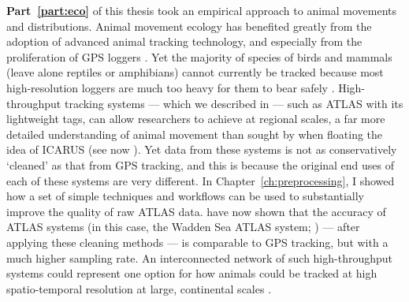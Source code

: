 \textbf{Part~\ref{part:eco}} of this thesis took an empirical approach to animal movements and distributions.
Animal movement ecology has benefited greatly from the adoption of advanced animal tracking technology, and especially from the proliferation of GPS loggers \citep{cagnacci2010}.
Yet the majority of species of birds and mammals (leave alone reptiles or amphibians) cannot currently be tracked because most high-resolution loggers are much too heavy for them to bear safely \parencite{kays2015}.
High-throughput tracking systems --- which we described in \textcite{nathan2022} --- such as ATLAS with its lightweight tags, can allow researchers to achieve at regional scales, a far more detailed understanding of animal movement than sought by \textcite{wikelski2007} when floating the idea of ICARUS (see now \cite{jetz2022}).
Yet data from these systems is not as conservatively `cleaned' as that from GPS tracking, and this is because the original end uses of each of these systems are very different.
In Chapter~\ref{ch:preprocessing}, I showed how a set of simple techniques and workflows can be used to substantially improve the quality of raw ATLAS data.
\textcite[]{beardsworth2022mee} have now shown that the accuracy of ATLAS systems (in this case, the Wadden Sea ATLAS system; \cite{bijleveld2021}) --- after applying these cleaning methods --- is comparable to GPS tracking, but with a much higher sampling rate.
An interconnected network of such high-throughput systems could represent one option for how animals could be tracked at high spatio-temporal resolution at large, continental scales \citep{nathan2022}.

